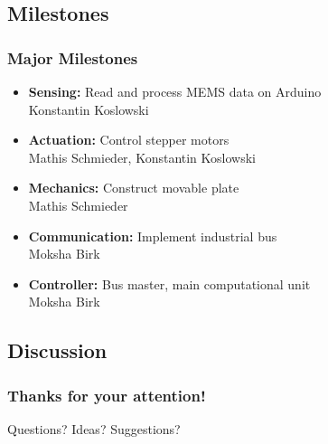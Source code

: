 \documentclass{beamer}
\begin{document}
\subsection{Milestones}
\begin{frame}
  \frametitle{Major Milestones}
	\begin{itemize}
		\item \textbf{Sensing:} Read and process MEMS data on Arduino\\
			\small{Konstantin Koslowski}
		\item \textbf{Actuation:} Control stepper motors\\
			\small{Mathis Schmieder, Konstantin Koslowski}
		\item \textbf{Mechanics:} Construct movable plate\\
			\small{Mathis Schmieder}
		\item \textbf{Communication:} Implement industrial bus\\
			\small{Moksha Birk}
		\item \textbf{Controller:} Bus master, main computational unit\\
			\small{Moksha Birk}
	\end{itemize}
\end{frame}

\subsection{Discussion}
\begin{frame}
	\frametitle{Thanks for your attention!}
	\huge{Questions? Ideas? Suggestions?}
\end{frame}
\end{document}

